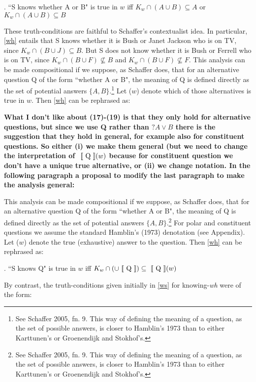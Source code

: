 \ex. \label{wh} ``S knows whether A or B" is true in $w$ iff
$K_{w}\cap(A \cup B) \subseteq A$ or $K_{w}\cap(A \cup B)
\subseteq B$

These truth-conditions are faithful to Schaffer's contextualist
idea. In particular, \ref{wh} entails that S knows whether it is
Bush or Janet Jackson who is on TV, since $K_{w}\cap (B \cup
J)\subseteq B$. But S does not know whether it is Bush or Ferrell
who is on TV, since $K_{w}\cap(B \cup F)\nsubseteq B$ and
$K_{w}\cap(B \cup F)\nsubseteq F$. This analysis can be made
compositional if we suppose, as Schaffer does, that for an
alternative question Q of the form ``whether A or B", the meaning
of Q is defined directly as the set of potential answers $\{A,
B\}$.\footnote{See Schaffer 2005, fn. 9. This way of defining the
meaning of a question, as the set of possible answers, is closer
to Hamblin's 1973 than to either Karttunen's or Groenendijk and
Stokhof's.}  Let ($w$) denote which of those alternatives is
true in $w$. Then \ref{wh} can be rephrased as:

 

{\bf What I don't like about (17)-(19) is that they only hold for alternative questions, but since we use Q rather than $?A \vee B$ there is the suggestion that they hold in general, for example also for constituent questions. So either (i) we make them general (but we need to change the interpretation of $\mbox{ $[\![$ Q $]\!]$}(w)$ because for constituent question we don't have a unique true alternative, or (ii) we change notation. In the following paragraph a proposal to modify the last paragraph to make the analysis  general:

This analysis can be made
compositional if we suppose, as Schaffer does, that for an
alternative question Q of the form ``whether A or B", the meaning
of Q is defined directly as the set of potential answers $\{A,
B\}$.\footnote{See Schaffer 2005, fn. 9. This way of defining the
meaning of a question, as the set of possible answers, is closer
to Hamblin's 1973 than to either Karttunen's or Groenendijk and
Stokhof's.}    For polar and constituent questions we assume the standard Hamblin's (1973) denotation (see Appendix).  Let ($w$) denote the true (exhaustive) answer to the question. Then \ref{wh} can be rephrased as:}

\ex. \label{cd} ``S knows Q" is true in $w$ iff $K_{w}\cap
(\cup\mbox{ $[\![$ Q $]\!]$}) \subseteq \mbox{ $[\![$ Q $]\!]$}(w)$


 
%
By contrast, the truth-conditions given initially in \ref{ws} for
knowing-\emph{wh} were of the form:

